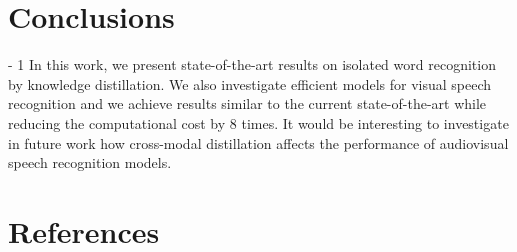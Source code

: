 \documentclass{article}
\begin{document}
\begin{table}
\begin{center}{}

\end{center}
\vspace{-3mm}
\caption{Performance of different efficient models on the LRW-1000 dataset. We use a sequence of 29-frame with a size of 112 by 112 to report multiply-add operations (FLOPs). The number of channels is scaled for different capacities, marked as  and . Channel widths are the standard ones for ShuffleNet v2, while base channel width for TCN is 256 channels.}
\label{tab:efficient_visual_lw_lrw1000}
\vspace{-4mm}
\end{table}

\section{Conclusions}
\looseness - 1
In this work, we present state-of-the-art results on isolated word recognition by knowledge distillation. We also investigate efficient models for visual speech recognition and we achieve results similar to the current state-of-the-art while reducing the computational cost by 8 times. It would be interesting to investigate in future work how cross-modal distillation affects the performance of audiovisual speech recognition models. 


\clearpage
\AtNextBibliography{\small}
\section{References}
\begingroup
\setlength\bibitemsep{1pt}
\printbibliography[heading=none]
\endgroup
\end{document}

